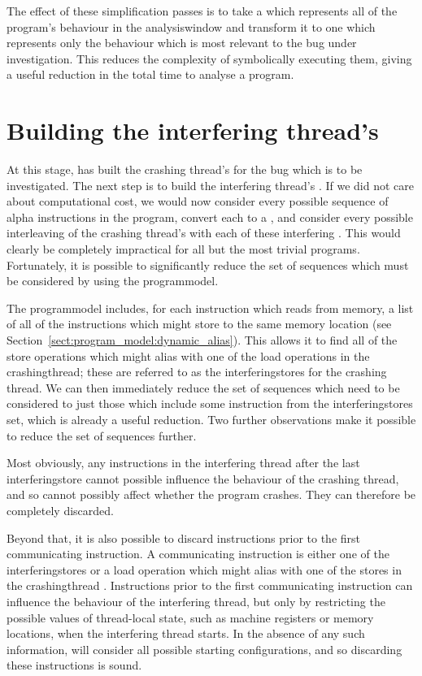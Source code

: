 The effect of these simplification passes is to take a {\StateMachine}
which represents all of the program's behaviour in the
\gls{analysiswindow} and transform it to one which represents only the
behaviour which is most relevant to the bug under investigation.  This
reduces the complexity of symbolically executing them, giving a useful
reduction in the total time to analyse a program.  

\section{Building the interfering thread's \StateMachines}
\label{sect:derive:write_side}

At this stage, {\technique} has built the crashing thread's
{\StateMachine} for the bug which is to be investigated.  The next
step is to build the interfering thread's {\StateMachine}.  If we did
not care about computational cost, we would now consider every
possible sequence of \gls{alpha} instructions in the program,
convert each to a {\StateMachine}, and consider every possible
interleaving of the crashing thread's {\StateMachine} with each of
these interfering {\StateMachines}.  This would clearly be completely
impractical for all but the most trivial programs.  Fortunately, it is
possible to significantly reduce the set of sequences which must be
considered by using the \gls{programmodel}.

The \gls{programmodel} includes, for each instruction which reads from
memory, a list of all of the instructions which might store to the
same memory location (see
Section~\ref{sect:program_model:dynamic_alias}).  This allows it to
find all of the store operations which might alias with one of the
load operations in the \gls{crashingthread}; these are referred to as
the \glspl{interferingstore} for the crashing thread.  We can then
immediately reduce the set of sequences which need to be considered to
just those which include some instruction from the
\glspl{interferingstore} set, which is already a useful reduction.
Two further observations make it possible to reduce the set of
sequences further.

Most obviously, any instructions in the interfering thread after the
last \gls{interferingstore} cannot possible influence the behaviour of
the crashing thread, and so cannot possibly affect whether the program
crashes.  They can therefore be completely discarded.

Beyond that, it is also possible to discard instructions prior to the
first communicating instruction.  A communicating instruction is
either one of the \glspl{interferingstore} or a load operation which
might alias with one of the stores in the \gls{crashingthread}
{\StateMachine}.  Instructions prior to the first communicating
instruction can influence the behaviour of the interfering thread, but
only by restricting the possible values of thread-local state, such as
machine registers or memory locations, when the interfering thread
starts.  In the absence of any such information, {\technique} will
consider all possible starting configurations, and so discarding these
instructions is sound.

